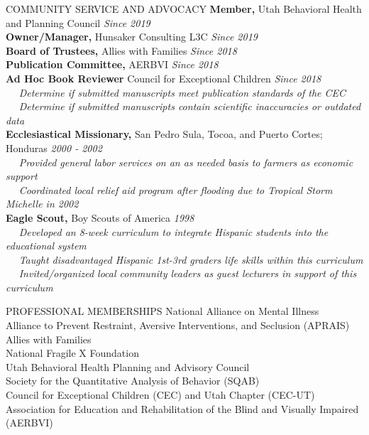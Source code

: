 \documentclass{resume} %
\begin{document}
\begin{rSection}{COMMUNITY SERVICE AND ADVOCACY}
	{\bf Member,} Utah Behavioral Health and Planning Council \hfill {\em Since 2019}
	\\{\bf Owner/Manager,} Hunsaker Consulting L3C \hfill {\em Since 2019}
	\\{\bf Board of Trustees,} Allies with Families \hfill {\em Since 2018}
	\\{\bf Publication Committee,} AERBVI \hfill {\em Since 2018}
	\\{\bf Ad Hoc Book Reviewer} Council for Exceptional Children \hfill {\em Since 2018}
    	\\ \textbullet~~ \textit{Determine if submitted manuscripts meet publication standards of the CEC}
	    \\ \textbullet~~ \textit{Determine if submitted manuscripts contain scientific inaccuracies or outdated data}
	\\{\bf Ecclesiastical Missionary,} San Pedro Sula, Tocoa, and Puerto Cortes; Honduras \hfill {\em 2000 - 2002}
        \\ \textbullet~~ \textit{Provided general labor services on an as needed basis to farmers as economic support}
        \\ \textbullet~~ \textit{Coordinated local relief aid program after flooding due to Tropical Storm Michelle in 2002}
	\\{\bf Eagle Scout,} Boy Scouts of America \hfill {\em 1998}
	    \\ \textbullet~~ \textit{Developed an 8-week curriculum to integrate Hispanic students into the educational system}
        \\ \textbullet~~ \textit{Taught disadvantaged Hispanic 1st-3rd graders life skills within this curriculum}
        \\ \textbullet~~ \textit{Invited/organized local community leaders as guest lecturers in support of this curriculum}
\end{rSection}

\begin{rSection}{PROFESSIONAL MEMBERSHIPS}
	{National Alliance on Mental Illness} 
	\\{Alliance to Prevent Restraint, Aversive Interventions, and Seclusion (APRAIS)} 
	\\{Allies with Families} 
	\\{National Fragile X Foundation} 
	\\{Utah Behavioral Health Planning and Advisory Council} 
	\\{Society for the Quantitative Analysis of Behavior (SQAB)} 
	\\{Council for Exceptional Children (CEC) and Utah Chapter (CEC-UT)} 
	\\{Association for Education and Rehabilitation of the Blind and Visually Impaired (AERBVI)} 
\end{rSection}
\end{document}
